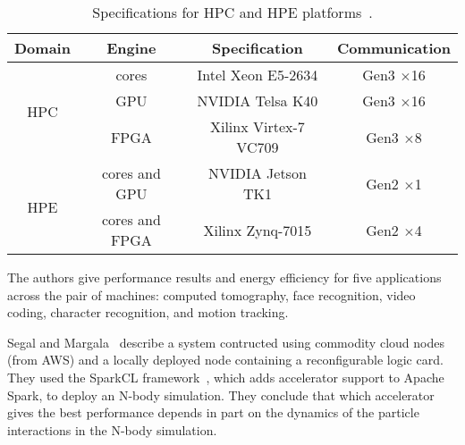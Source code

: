 \begin{table}[ht]
\centering
\caption{Specifications for HPC and HPE platforms~\protect\cite{rpm+15}.}
\label{tbl:hpchpe}
\vspace{0.1in}
\begin{tabular}{c | c | c | c}
Domain & Engine & Specification & Communication \\ \hline
\multirow{3}{*}{HPC} & cores & Intel Xeon E5-2634 & Gen3 $\times$16 \\
 & GPU & NVIDIA Telsa K40 & Gen3 $\times$16 \\ 
 & FPGA & Xilinx Virtex-7 VC709 & Gen3 $\times$8 \\ \hline
\multirow{2}{*}{HPE} & cores and GPU & NVIDIA Jetson TK1 & Gen2 $\times$1 \\
 & cores and FPGA & Xilinx Zynq-7015 & Gen2 $\times$4
\end{tabular}
\end{table}

The authors give performance results and energy efficiency for five
applications across the pair of machines:
computed tomography, face recognition, video coding, character recognition,
and motion tracking.

Segal and Margala~\cite{sm16} describe a system contructed using commodity cloud
nodes (from AWS) and a locally deployed node containing a reconfigurable logic
card.  They used the SparkCL framework~\cite{sparkcl}, which adds accelerator
support to Apache Spark, to deploy an N-body simulation. They conclude that
which accelerator gives the best performance depends in part on the dynamics
of the particle interactions in the N-body simulation.
